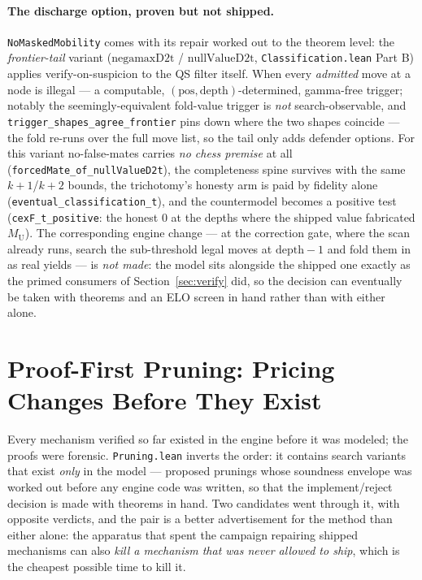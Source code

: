 \documentclass[11pt]{article}
\newcommand{\MU}{M_{\mathrm{U}}}    %
\theoremstyle{plain}
\theoremstyle{definition}
\theoremstyle{remark}
\begin{document}
\paragraph{The discharge option, proven but not shipped.}
\texttt{NoMaskedMobility} comes with its repair worked out to the
theorem level: the \emph{frontier-tail} variant
($\mathrm{negamaxD2t}$ / $\mathrm{nullValueD2t}$,
\texttt{Classification.lean} Part B) applies verify-on-suspicion to
the QS filter itself.  When every \emph{admitted} move at a node is
illegal --- a computable, $(\mathrm{pos},\mathrm{depth})$-determined,
gamma-free trigger; notably the seemingly-equivalent fold-value
trigger is \emph{not} search-observable, and
\texttt{trigger\_shapes\_agree\_frontier} pins down where the two
shapes coincide --- the fold re-runs over the full move list, so the
tail only adds defender options.  For this variant no-false-mates
carries \emph{no chess premise} at all
(\texttt{forcedMate\_of\_nullValueD2t}), the completeness spine
survives with the same $k+1$/$k+2$ bounds, the trichotomy's honesty
arm is paid by fidelity alone (\texttt{eventual\_classification\_t}),
and the countermodel becomes a positive test
(\texttt{cexF\_t\_positive}: the honest $0$ at the depths where the
shipped value fabricated $\MU$).  The corresponding engine change ---
at the correction gate, where the scan already runs, search the
sub-threshold legal moves at $\mathrm{depth}-1$ and fold them in as
real yields --- is \emph{not made}: the model sits alongside the
shipped one exactly as the primed consumers of
Section~\ref{sec:verify} did, so the decision can eventually be taken
with theorems and an ELO screen in hand rather than with either alone.

\section{Proof-First Pruning: Pricing Changes Before They Exist}
\label{sec:pruning}

Every mechanism verified so far existed in the engine before it was
modeled; the proofs were forensic.  \texttt{Pruning.lean} inverts the
order: it contains search variants that exist \emph{only} in the
model --- proposed prunings whose soundness envelope was worked out
before any engine code was written, so that the implement/reject
decision is made with theorems in hand.  Two candidates went through
it, with opposite verdicts, and the pair is a better advertisement for
the method than either alone: the apparatus that spent the campaign
repairing shipped mechanisms can also \emph{kill a mechanism that was
never allowed to ship}, which is the cheapest possible time to kill
it.
\end{document}

